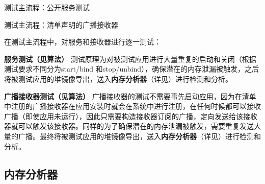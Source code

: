 \begin{algorithm}
	\caption{测试主流程：公开服务测试}
	\label{alg:service}
	\begin{algorithmic}[1]
			\ENDIF
				\ELSE
				\ENDIF
			\ENDWHILE
			\ENDIF
		\ENDFOR
	\end{algorithmic}
\end{algorithm}

\begin{algorithm}
	\caption{测试主流程：清单声明的广播接收器}
	\label{alg:receiver}
	\begin{algorithmic}[1]
			\ENDWHILE
		\ENDFOR
	\end{algorithmic}
\end{algorithm}

在测试主流程中，对服务和接收器进行逐一测试：

\textbf{服务测试（见算法\redbf{\ref{alg:service}}） }  测试原理为对被测试应用进行大量重复的启动和关闭（根据测试要求不同分为start/bind 和stop/unbind），确保潜在的内存泄漏被触发，之后将被测试应用的堆镜像导出，送入\textbf{内存分析器}（详见\redbf{\ref{memory analyser}}）进行检测和分析。

\textbf{广播接收器测试（见算法\redbf{\ref{alg:receiver}}） }
广播接收器的测试不需要事先启动应用，因为在清单中注册的广播接收器在应用安装时就会在系统中进行注册，在任何时候都可以接收广播（即使应用未运行），因此只需要构造接收器订阅的广播，定向发送给该接收器就可以触发该接收器。同样的为了确保潜在的内存泄漏被触发，需要重复发送大量的广播。最终将被测试应用的堆镜像导出，送入\textbf{内存分析器}（详见\redbf{\ref{memory analyser}}）进行检测和分析。
\subsection{内存分析器}\label{memory analyser}

